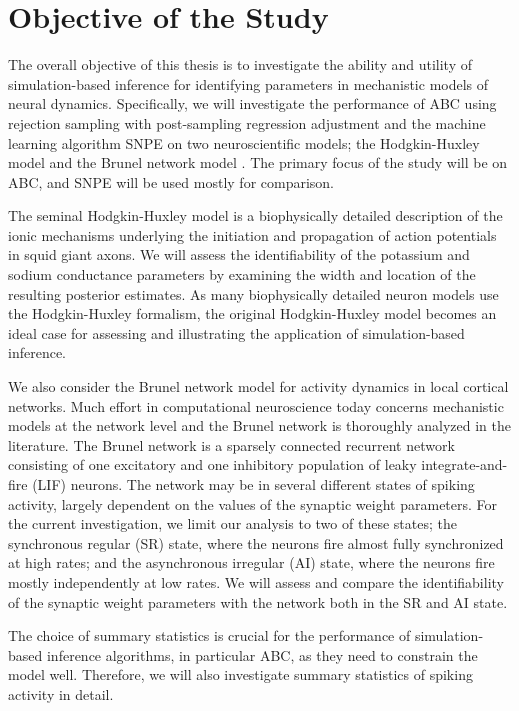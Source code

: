 \section{Objective of the Study}

The overall objective of this thesis is to investigate the ability and utility of simulation-based inference for identifying parameters in mechanistic models of neural dynamics. Specifically, we will investigate the performance of ABC using rejection sampling with post-sampling regression adjustment and the machine learning algorithm SNPE on two neuroscientific models; the Hodgkin-Huxley model \cite{HH1952} and the Brunel network model \cite{Brunel2000}. The primary focus of the study will be on ABC, and SNPE will be used mostly for comparison. 

The seminal Hodgkin-Huxley model is a biophysically detailed description of the ionic mechanisms underlying the initiation and propagation of action potentials in squid giant axons. We will assess the identifiability of the potassium and sodium conductance parameters by examining the width and location of the resulting posterior estimates. As many biophysically detailed neuron models use the Hodgkin-Huxley formalism, the original Hodgkin-Huxley model becomes an ideal case for assessing and illustrating the application of simulation-based inference. 

We also consider the Brunel network model for activity dynamics in local cortical networks. Much effort in computational neuroscience today concerns mechanistic models at the network level and the Brunel network is thoroughly analyzed in the literature. The Brunel network is a sparsely connected recurrent network consisting of one excitatory and one inhibitory population of leaky integrate-and-fire (LIF) neurons. The network may be in several different states of spiking activity, largely dependent on the values of the synaptic weight parameters. For the current investigation, we limit our analysis to two of these states; the synchronous regular (SR) state, where the neurons fire almost fully synchronized at high rates; and the asynchronous irregular (AI) state, where the neurons fire mostly independently at low rates. We will assess and compare the identifiability of the synaptic weight parameters with the network both in the SR and AI state. 

The choice of summary statistics is crucial for the performance of simulation-based inference algorithms, in particular ABC, as they need to constrain the model well. Therefore, we will also investigate summary statistics of spiking activity in detail. 

